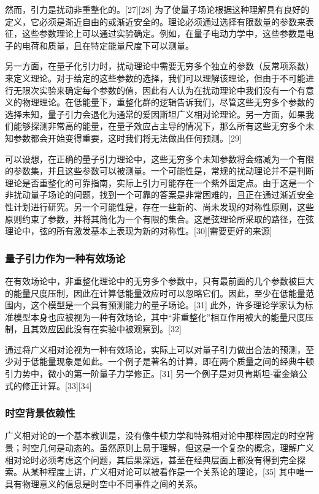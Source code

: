 然而，引力是扰动非重整化的。[27][28] 为了使量子场论根据这种理解具有良好的定义，它必须是渐近自由的或渐近安全的。理论必须通过选择有限数量的参数来表征，这些参数理论上可以通过实验确定。例如，在量子电动力学中，这些参数是电子的电荷和质量，且在特定能量尺度下可以测量。

另一方面，在量子化引力时，扰动理论中需要无穷多个独立的参数（反常项系数）来定义理论。对于给定的这些参数的选择，我们可以理解该理论，但由于不可能进行无限次实验来确定每个参数的值，因此有人认为在扰动理论中我们没有一个有意义的物理理论。在低能量下，重整化群的逻辑告诉我们，尽管这些无穷多个参数的选择未知，量子引力会退化为通常的爱因斯坦广义相对论理论。另一方面，如果我们能够探测非常高的能量，在量子效应占主导的情况下，那么所有这些无穷多个未知参数都会开始变得重要，这时我们将无法做出任何预测。[29]

可以设想，在正确的量子引力理论中，这些无穷多个未知参数将会缩减为一个有限的参数集，并且这些参数可以被测量。一个可能性是，常规的扰动理论并不是判断理论是否重整化的可靠指南，实际上引力可能存在一个紫外固定点。由于这是一个非扰动量子场论的问题，找到一个可靠的答案是非常困难的，且正在通过渐近安全性计划进行研究。另一个可能性是，存在一些新的、尚未发现的对称性原则，这些原则约束了参数，并将其简化为一个有限的集合。这是弦理论所采取的路径，在弦理论中，弦的所有激发基本上表现为新的对称性。[30][需要更好的来源]
\subsubsection{量子引力作为一种有效场论} 
在有效场论中，非重整化理论中的无穷多个参数中，只有最前面的几个参数被巨大的能量尺度压制，因此在计算低能量效应时可以忽略它们。因此，至少在低能量范围内，这个模型是一个具有预测能力的量子场论。[31] 此外，许多理论学家认为标准模型本身也应被视为一种有效场论，其中“非重整化”相互作用被大的能量尺度压制，且其效应因此没有在实验中被观察到。[32]

通过将广义相对论视为一种有效场论，实际上可以对量子引力做出合法的预测，至少对于低能量现象是如此。一个例子是著名的计算，即在两个质量之间的经典牛顿引力势中，微小的第一阶量子力学修正。[31] 另一个例子是对贝肯斯坦-霍金熵公式的修正计算。[33][34]
\subsubsection{时空背景依赖性}  
广义相对论的一个基本教训是，没有像牛顿力学和特殊相对论中那样固定的时空背景；时空几何是动态的。虽然原则上易于理解，但这是一个复杂的概念，理解广义相对论时必须考虑这个问题，其后果深远，甚至在经典层面上都没有得到完全探索。从某种程度上讲，广义相对论可以被看作是一个关系论的理论，[35] 其中唯一具有物理意义的信息是时空中不同事件之间的关系。

